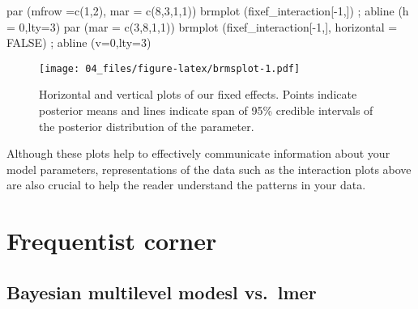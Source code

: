 \documentclass[
]{book}
\newenvironment{Shaded}{\begin{snugshade}}{\end{snugshade}}
\newcommand{\AttributeTok}[1]{\textcolor[rgb]{0.77,0.63,0.00}{#1}}
\newcommand{\ConstantTok}[1]{\textcolor[rgb]{0.00,0.00,0.00}{#1}}
\newcommand{\DecValTok}[1]{\textcolor[rgb]{0.00,0.00,0.81}{#1}}
\newcommand{\FunctionTok}[1]{\textcolor[rgb]{0.00,0.00,0.00}{#1}}
\newcommand{\NormalTok}[1]{#1}
\newcommand{\SpecialCharTok}[1]{\textcolor[rgb]{0.00,0.00,0.00}{#1}}
\begin{document}
\begin{Shaded}
\begin{Highlighting}[]
\FunctionTok{par}\NormalTok{ (}\AttributeTok{mfrow =}\FunctionTok{c}\NormalTok{(}\DecValTok{1}\NormalTok{,}\DecValTok{2}\NormalTok{), }\AttributeTok{mar =} \FunctionTok{c}\NormalTok{(}\DecValTok{8}\NormalTok{,}\DecValTok{3}\NormalTok{,}\DecValTok{1}\NormalTok{,}\DecValTok{1}\NormalTok{))}
\FunctionTok{brmplot}\NormalTok{ (fixef\_interaction[}\SpecialCharTok{{-}}\DecValTok{1}\NormalTok{,]) ; }\FunctionTok{abline}\NormalTok{ (}\AttributeTok{h =} \DecValTok{0}\NormalTok{,}\AttributeTok{lty=}\DecValTok{3}\NormalTok{)}
\FunctionTok{par}\NormalTok{ (}\AttributeTok{mar =} \FunctionTok{c}\NormalTok{(}\DecValTok{3}\NormalTok{,}\DecValTok{8}\NormalTok{,}\DecValTok{1}\NormalTok{,}\DecValTok{1}\NormalTok{))}
\FunctionTok{brmplot}\NormalTok{ (fixef\_interaction[}\SpecialCharTok{{-}}\DecValTok{1}\NormalTok{,], }\AttributeTok{horizontal =} \ConstantTok{FALSE}\NormalTok{) ; }\FunctionTok{abline}\NormalTok{ (}\AttributeTok{v=}\DecValTok{0}\NormalTok{,}\AttributeTok{lty=}\DecValTok{3}\NormalTok{)}
\end{Highlighting}
\end{Shaded}

\begin{figure}
\centering
\texttt{[image: 04\_files/figure-latex/brmsplot-1.pdf]}
\caption{\label{fig:brmsplot}Horizontal and vertical plots of our fixed effects. Points indicate posterior means and lines indicate span of 95\% credible intervals of the posterior distribution of the parameter.}
\end{figure}

Although these plots help to effectively communicate information about your model parameters, representations of the data such as the interaction plots above are also crucial to help the reader understand the patterns in your data.

\hypertarget{frequentist-corner-2}{%
\section{Frequentist corner}\label{frequentist-corner-2}}

\hypertarget{bayesian-multilevel-modesl-vs.-lmer-2}{%
\subsection{Bayesian multilevel modesl vs.~lmer}\label{bayesian-multilevel-modesl-vs.-lmer-2}}
\end{document}
